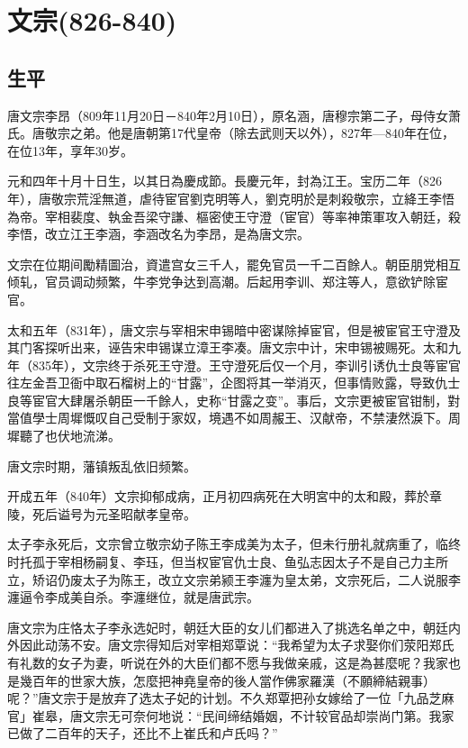 
\section{文宗\tiny(826-840)}

\subsection{生平}

唐文宗李昂（809年11月20日－840年2月10日），原名涵，唐穆宗第二子，母侍女萧氏。唐敬宗之弟。他是唐朝第17代皇帝（除去武则天以外），827年—840年在位，在位13年，享年30岁。

元和四年十月十日生，以其日為慶成節。長慶元年，封為江王。宝历二年（826年），唐敬宗荒淫無道，虐待宦官劉克明等人，劉克明於是刺殺敬宗，立絳王李悟為帝。宰相裴度、執金吾梁守謙、樞密使王守澄（宦官）等率神策軍攻入朝廷，殺李悟，改立江王李涵，李涵改名为李昂，是為唐文宗。

文宗在位期间勵精圖治，資遣宫女三千人，罷免官员一千二百餘人。朝臣朋党相互倾轧，官员调动频繁，牛李党争达到高潮。后起用李训、郑注等人，意欲铲除宦官。

太和五年（831年），唐文宗与宰相宋申锡暗中密谋除掉宦官，但是被宦官王守澄及其门客探听出来，诬告宋申锡谋立漳王李凑。唐文宗中计，宋申锡被赐死。太和九年（835年），文宗终于杀死王守澄。王守澄死后仅一个月，李训引诱仇士良等宦官往左金吾卫衙中取石榴树上的“甘露”，企图将其一举消灭，但事情败露，导致仇士良等宦官大肆屠杀朝臣一千餘人，史称“甘露之变”。事后，文宗更被宦官钳制，對當值學士周墀慨叹自己受制于家奴，境遇不如周赧王、汉献帝，不禁淒然淚下。周墀聽了也伏地流涕。

唐文宗时期，藩镇叛乱依旧频繁。

开成五年（840年）文宗抑郁成病，正月初四病死在大明宮中的太和殿，葬於章陵，死后谥号为元圣昭献孝皇帝。

太子李永死后，文宗曾立敬宗幼子陈王李成美为太子，但未行册礼就病重了，临终时托孤于宰相杨嗣复、李珏，但当权宦官仇士良、鱼弘志因太子不是自己力主所立，矫诏仍废太子为陈王，改立文宗弟颍王李瀍为皇太弟，文宗死后，二人说服李瀍逼令李成美自杀。李瀍继位，就是唐武宗。

唐文宗为庄恪太子李永选妃时，朝廷大臣的女儿们都进入了挑选名单之中，朝廷内外因此动荡不安。唐文宗得知后对宰相郑覃说：“我希望为太子求娶你们荥阳郑氏有礼数的女子为妻，听说在外的大臣们都不愿与我做亲戚，这是為甚麼呢？我家也是幾百年的世家大族，怎麼把神堯皇帝的後人當作佛家羅漢（不願締結親事）呢？”唐文宗于是放弃了选太子妃的计划。不久郑覃把孙女嫁给了一位「九品芝麻官」崔皋，唐文宗无可奈何地说：“民间缔结婚姻，不计较官品却崇尚门第。我家已做了二百年的天子，还比不上崔氏和卢氏吗？”

